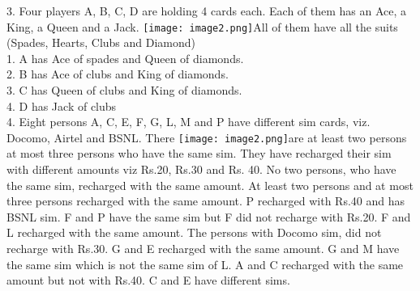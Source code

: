 \documentclass[
]{article}
\begin{document}
3. Four players A, B, C, D are holding 4 cards each. Each of them has an Ace, a King, a Queen
and a Jack. \texttt{[image: image2.png]}All of them have all the suits (Spades, Hearts, Clubs and Diamond)\\
1. A has Ace of spades and Queen of diamonds.\\
2. B has Ace of clubs and King of diamonds.\\
3. C has Queen of clubs and King of diamonds.\\
4. D has Jack of clubs\\

4. Eight persons A, C, E, F, G, L, M and P have different sim cards, viz. Docomo, Airtel and
BSNL. There \texttt{[image: image2.png]}are at least two persons at most three persons who have the same sim. They
have recharged their sim with different amounts viz Rs.20, Rs.30 and Rs. 40. No two
persons, who have the same sim, recharged with the same amount. At least two persons and
at most three persons recharged with the same amount. P recharged with Rs.40 and has
BSNL sim. F and P have the same sim but F did not recharge with Rs.20. F and L recharged
with the same amount. The persons with Docomo sim, did not recharge with Rs.30. G and E
recharged with the same amount. G and M have the same sim which is not the same sim of
L. A and C recharged with the same amount but not with Rs.40. C and E have different
sims.\\
\end{document}
